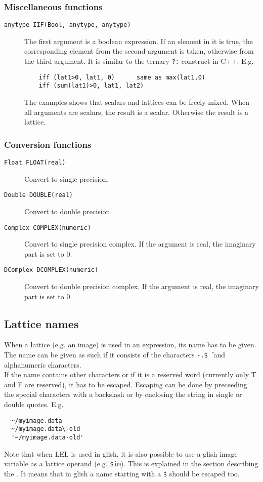 \subsubsection{Miscellaneous functions}
\begin{description}
  \item[ \texttt{anytype IIF(Bool, anytype, anytype)}]
    The first argument is a boolean expression. If an element in
    it is true, the corresponding element from the second argument is
    taken, otherwise from the third argument. It is similar to the
    ternary \texttt{?:} construct in C++. E.g.
    \begin{verbatim}
    iff (lat1>0, lat1, 0)      same as max(lat1,0)
    iff (sum(lat1)>0, lat1, lat2)
    \end{verbatim}
    The examples shows that scalars and lattices can be freely mixed.
    When all arguments are scalars, the result is a scalar. Otherwise
    the result is a lattice.
\end{description}

\subsubsection{Conversion functions}
\begin{description}
  \item[ \texttt{Float FLOAT(real)}]
    Convert to single precision.
  \item[ \texttt{Double DOUBLE(real)}]
    Convert to double precision.
  \item[ \texttt{Complex COMPLEX(numeric)}]
    Convert to single precision complex.
    If the argument is real, the imaginary part is set to 0.
  \item[ \texttt{DComplex DCOMPLEX(numeric)}]
    Convert to double precision complex.
    If the argument is real, the imaginary part is set to 0.
\end{description}

\subsection{\label{LEL:LATTICES}Lattice names}
When a lattice (e.g. an image) is used in an expression, its name
has to be given. The name can be given as such if it consists of
the characters \texttt{-}\texttt{.}\texttt{\$}\texttt{\~\ }
and alphanumeric characters.
\\If the name contains other characters or if it is a reserved word
(currently only T and F are reserved), it has to be escaped.
Escaping can be done by preceeding the special characters with a
backslash or by enclosing the string in single or double quotes.
E.g.
\begin{verbatim}
  ~/myimage.data
  ~/myimage.data\-old
  '~/myimage.data-old'
\end{verbatim}
Note that when LEL is used in glish, it is also possible to use
a glish image variable as a lattice operand (e.g. \texttt{\$im}).
This is explained in the section describing the
. It means that in glish a
name starting with a \texttt{\$} should be escaped too.

